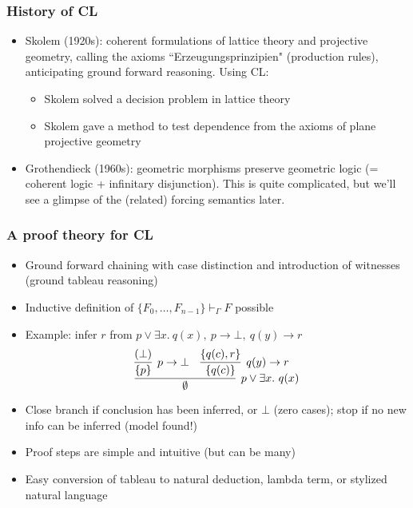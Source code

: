 \documentclass[handout,11pt]{beamer}
\newcommand{\set}[1]{\{#1\}}
\begin{document}
\begin{frame}
\frametitle{History of CL}
 \begin{itemize}[<+->]   %
    \item Skolem (1920s): coherent formulations of lattice theory 
    and projective geometry, calling the axioms ``Erzeugungsprinzipien"
    (production rules), anticipating ground forward reasoning. Using CL:
    \begin{itemize}[<+->]   %
    \item Skolem solved a decision problem in lattice theory
    \item Skolem gave a method to test dependence from the axioms
    of plane projective geometry   
    \end{itemize}
    
    \item Grothendieck (1960s): geometric morphisms preserve geometric
              logic (= coherent logic + infinitary disjunction).
    This is quite complicated, but we'll see a glimpse of the (related)
    forcing semantics later.
 \end{itemize}
\end{frame}


\begin{frame}
\frametitle{A proof theory for CL}
 \begin{itemize}[<+->]   %
    \item Ground forward chaining with case distinction and introduction of witnesses
(ground tableau reasoning)
    \item Inductive definition of $\set{F_0,\ldots,F_{n-1}}\vdash_\Gamma F$ possible %
    \item Example: infer $r$ from $p\lor \exists x.~q(x),~p\to\bot,~q(y)\to r$
    \[
\infer[p\vee \exists x.~q(x)]{\emptyset}
{
\infer[p\to\bot]{\set{p}}{(\bot)} & \infer[q(y)\to r]{\set{q(c)}}{\set{q(c),r}}
}
\]
    \item Close branch if conclusion has been inferred,
    or $\bot$ (zero cases); stop if no new info can be inferred (model found!) 
    \item Proof steps are simple and intuitive (but can be many)
    \item Easy conversion of tableau to natural deduction, lambda term, or stylized natural language
 \end{itemize}
\end{frame}
\end{document}
